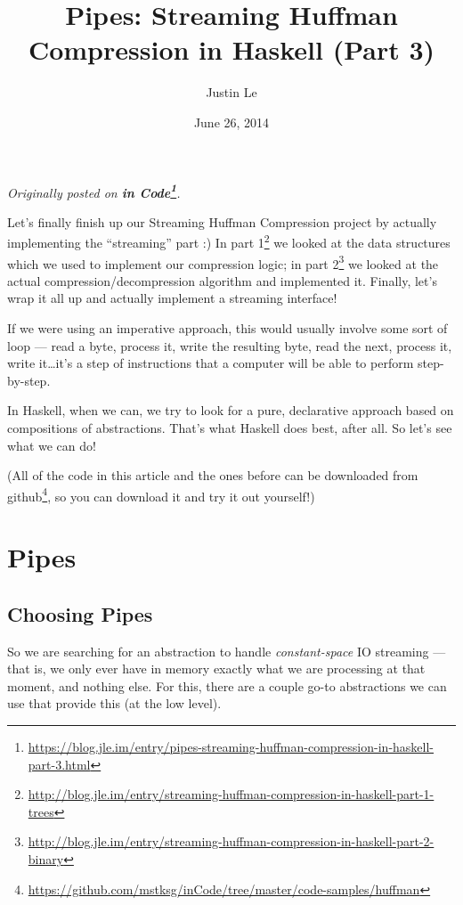 \documentclass[]{article}
\title{Pipes: Streaming Huffman Compression in Haskell (Part 3)}
\author{Justin Le}
\date{June 26, 2014}
\renewcommand{\href}[2]{#2\footnote{\url{#1}}}
\begin{document}
\maketitle

\emph{Originally posted on
\textbf{\href{https://blog.jle.im/entry/pipes-streaming-huffman-compression-in-haskell-part-3.html}{in
Code}}.}

Let's finally finish up our Streaming Huffman Compression project by actually
implementing the ``streaming'' part :) In
\href{http://blog.jle.im/entry/streaming-huffman-compression-in-haskell-part-1-trees}{part
1} we looked at the data structures which we used to implement our compression
logic; in
\href{http://blog.jle.im/entry/streaming-huffman-compression-in-haskell-part-2-binary}{part
2} we looked at the actual compression/decompression algorithm and implemented
it. Finally, let's wrap it all up and actually implement a streaming interface!

If we were using an imperative approach, this would usually involve some sort of
loop --- read a byte, process it, write the resulting byte, read the next,
process it, write it\ldots it's a step of instructions that a computer will be
able to perform step-by-step.

In Haskell, when we can, we try to look for a pure, declarative approach based
on compositions of abstractions. That's what Haskell does best, after all. So
let's see what we can do!

(All of the code in this article and the ones before can be downloaded
\href{https://github.com/mstksg/inCode/tree/master/code-samples/huffman}{from
github}, so you can download it and try it out yourself!)

\hypertarget{pipes}{%
\section{Pipes}\label{pipes}}

\hypertarget{choosing-pipes}{%
\subsection{Choosing Pipes}\label{choosing-pipes}}

So we are searching for an abstraction to handle \emph{constant-space} IO
streaming --- that is, we only ever have in memory exactly what we are
processing at that moment, and nothing else. For this, there are a couple go-to
abstractions we can use that provide this (at the low level).
\end{document}
